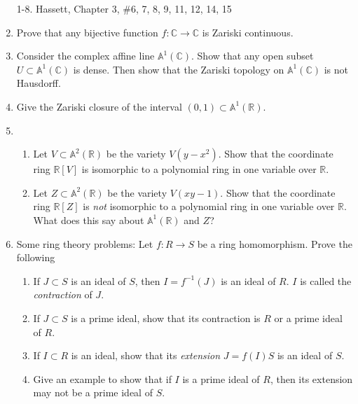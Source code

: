 \documentclass[11pt]{report}
\newcommand\CC{{\mathbb C}}
\newcommand\RR{{\mathbb R}}
\newcommand\A{{\mathbb A}}
\begin{document}
\enlargethispage{.5cm}


\vskip 1cm

\begin{enumerate}


\item[1-8.] Hassett, Chapter 3, \#6, 7, 8, 9, 11, 12, 14, 15

\setcounter{enumi}{8}
\item Prove that any bijective function $f: \CC \to \CC$ is Zariski continuous.

\item Consider the complex affine line $\A^1(\CC)$.  Show that any open subset $U \subset \A^1(\CC)$
is dense.  Then show that the Zariski topology on $\A^1(\CC)$ is not Hausdorff.

\item Give the Zariski closure of the interval $(0,1) \subset \A^1(\RR)$.

\item 

\begin{enumerate}

\item Let $V \subset \A^2(\RR)$ be the variety $V(y-x^2)$.  Show that the coordinate ring
$\RR[V]$ is isomorphic to a polynomial ring in one variable over $\RR$.

\item Let $Z \subset \A^2(\RR)$ be the variety $V(xy - 1)$.  Show that the coordinate ring
$\RR[Z]$ is \emph{not} isomorphic to a polynomial ring in one variable over $\RR$.  What does
this say about $\A^1 (\RR)$ and $Z$?

\end{enumerate}

\item Some ring theory problems:  Let $f: R \to S$ be a ring homomorphism.  Prove the following

\begin{enumerate}

\item If $J \subset S$ is an ideal of $S$, then $I = f^{-1}(J)$ is an ideal of $R$.  $I$ is called the
\emph{contraction} of $J$.

\item If $J \subset S$ is a prime ideal, show that its contraction is $R$ or a prime ideal of $R$.

\item If $I \subset R$ is an ideal, show that its \emph{extension} $J = f(I) S$ is an ideal of $S$.

\item Give an example to show that if $I$ is a prime ideal of $R$, then its extension may not
be a prime ideal of $S$.

\end{enumerate}

\end{enumerate}
\end{document}
